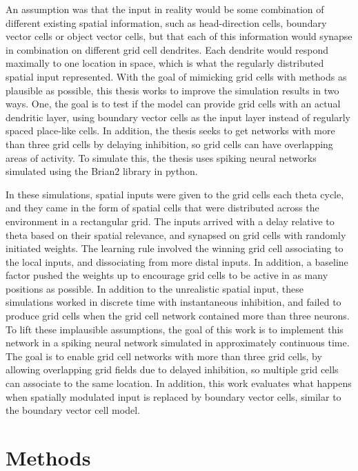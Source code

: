 \documentclass{article}
\begin{document}
    An assumption was that the input in reality would be some combination of different existing spatial information, such as head-direction cells, boundary vector cells or object vector cells, but that each of this information would synapse in combination on different grid cell dendrites. Each dendrite would respond maximally to one location in space, which is what the regularly distributed spatial input represented.
    With the goal of mimicking grid cells with methods as plausible as possible, this thesis works to improve the simulation results in two ways. One, the goal is to test if the model can provide grid cells with an actual dendritic layer, using boundary vector cells as the input layer instead of regularly spaced place-like cells. In addition, the thesis seeks to get networks with more than three grid cells by delaying inhibition, so grid cells can have overlapping areas of activity.
    To simulate this, the thesis uses spiking neural networks simulated using the Brian2 library in python. 
    
    In these simulations, spatial inputs were given to the grid cells each theta cycle, and they came in the form of spatial cells that were distributed across the environment in a rectangular grid. The inputs arrived with a delay relative to theta based on their spatial relevance, and synapsed on grid cells with randomly initiated weights. The learning rule involved the winning grid cell associating to the local inputs, and dissociating from more distal inputs. In addition, a baseline factor pushed the weights up to encourage grid cells to be active in as many positions as possible.
    In addition to the unrealistic spatial input, these simulations worked in discrete time with instantaneous inhibition, and failed to produce grid cells when the grid cell network contained more than three neurons.
    To lift these implausible assumptions, the goal of this work is to implement this network in a spiking neural network simulated in approximately continuous time. The goal is to enable grid cell networks with more than three grid cells, by allowing overlapping grid fields due to delayed inhibition, so multiple grid cells can associate to the same location. In addition, this work evaluates what happens when spatially modulated input is replaced by boundary vector cells, similar to the boundary vector cell model.
    
    \section{Methods} 
\end{document}
